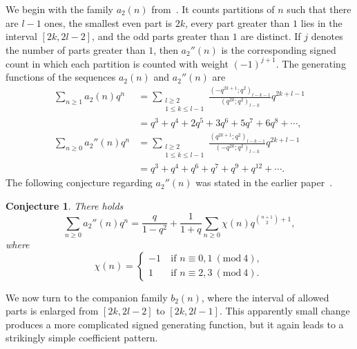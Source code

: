 \documentclass[reqno]{amsart}
\theoremstyle{definition}
\theoremstyle{plain}
\newtheorem{conjecture} {Conjecture}
\theoremstyle{remark}
\numberwithin{equation}{section}
\newcommand{\Mod}[1]{\ (\mathrm{mod}\ #1)}
\newcommand{\fr}{\frac}
\begin{document}
We begin with the family $a_2(n)$ from~\cite[Definition 2]{Andrews-Bachraoui conjectures}. It counts partitions of $n$ such that there are $l-1$ ones, the smallest even part is $2k$, every part greater than $1$ lies in the interval $[2k,2l-2]$, and the odd parts greater than $1$ are distinct. If $j$ denotes the number of parts greater than $1$, then $a_2''(n)$ is the corresponding signed count in which each partition is counted with weight $(-1)^{j+1}$. The generating functions of the sequences $a_2(n)$ and $a_2''(n)$ are
\begin{align*}
\sum_{n\geq 1} a_2(n) q^n &= \sum_{\substack{l\geq 2\\1\leq k\leq l-1}}\fr{(-q^{2k+1};q^2)_{l-k-1}}{(q^{2k};q^2)_{l-k}}q^{2k+l-1} \\
&=q^3+q^4+2q^5+3q^6+5q^7+6q^8+\cdots, \\
\sum_{n\geq 0} a_2''(n) q^n &= \sum_{\substack{l\geq 2\\1\leq k\leq l-1}}\fr{(q^{2k+1};q^2)_{l-k-1}}{(-q^{2k};q^2)_{l-k}}q^{2k+l-1} \\
&=q^3+q^4+q^6+q^7+q^9+q^{12}+\cdots.
\end{align*}
The following conjecture regarding $a_2''(n)$ was stated in the earlier paper~\cite[Conjecture 1]{Andrews-Bachraoui conjectures}.
\begin{conjecture}\label{conj1}
There holds
\begin{equation}\label{conj1-id}
\sum_{n\geq 0} a_2''(n) q^n
=\fr{q}{1-q^2}+\fr{1}{1+q}\sum_{n\geq 0} \chi(n) q^{\binom{n+1}{2}+1},
\end{equation}
where
\[
\chi(n)
=\begin{cases}
-1 &\ \text{if\ }n\equiv 0,1\Mod{4}, \\
1 &\ \text{if\ }n\equiv 2,3\Mod{4}.
\end{cases}
\]
\end{conjecture}

We now turn to the companion family $b_2(n)$, where the interval of allowed parts is enlarged from $[2k,2l-2]$ to $[2k,2l-1]$. This apparently small change produces a more complicated signed generating function, but it again leads to a strikingly simple coefficient pattern.
\end{document}

